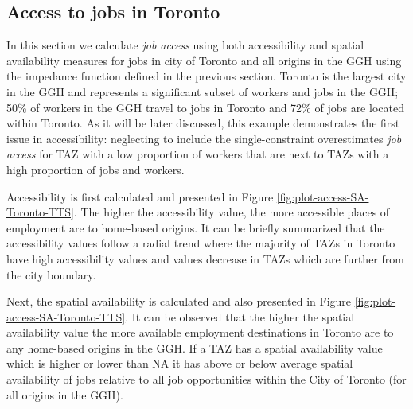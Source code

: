 \documentclass[]{elsarticle} %
\begin{document}
\hypertarget{access-to-jobs-in-toronto}{%
\subsection{Access to jobs in Toronto}\label{access-to-jobs-in-toronto}}

In this section we calculate \emph{job access} using both accessibility
and spatial availability measures for jobs in city of Toronto and all
origins in the GGH using the impedance function defined in the previous
section. Toronto is the largest city in the GGH and represents a
significant subset of workers and jobs in the GGH; 50\% of workers in
the GGH travel to jobs in Toronto and 72\% of jobs are located within
Toronto. As it will be later discussed, this example demonstrates the
first issue in accessibility: neglecting to include the
single-constraint overestimates \emph{job access} for TAZ with a low
proportion of workers that are next to TAZs with a high proportion of
jobs and workers.

Accessibility is first calculated and presented in Figure
\ref{fig:plot-access-SA-Toronto-TTS}. The higher the accessibility
value, the more accessible places of employment are to home-based
origins. It can be briefly summarized that the accessibility values
follow a radial trend where the majority of TAZs in Toronto have high
accessibility values and values decrease in TAZs which are further from
the city boundary.

Next, the spatial availability is calculated and also presented in
Figure \ref{fig:plot-access-SA-Toronto-TTS}. It can be observed that the
higher the spatial availability value the more available employment
destinations in Toronto are to any home-based origins in the GGH. If a
TAZ has a spatial availability value which is higher or lower than NA it
has above or below average spatial availability of jobs relative to all
job opportunities within the City of Toronto (for all origins in the
GGH).
\end{document}
